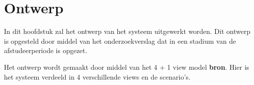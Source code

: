 \chapter{Ontwerp}
In dit hoofdstuk zal het ontwerp van het systeem uitgewerkt worden.
Dit ontwerp is opgesteld door middel van het onderzoekverslag dat in een stadium van de afstudeerperiode is opgezet.

\whitespace[2]
Het ontwerp wordt gemaakt door middel van het 4 + 1 view model \textbf{bron}.
Hier is het systeem verdeeld in 4 verschillende views en de scenario's.






